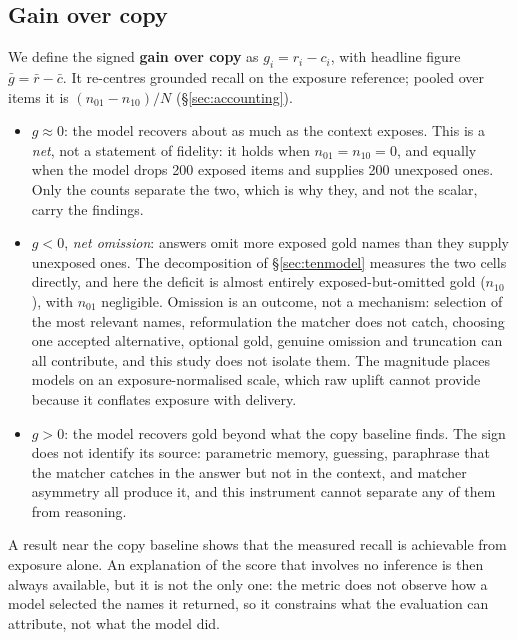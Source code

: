 \documentclass[10pt,twocolumn]{article}
\begin{document}
\subsection{Gain over copy}
We define the signed \textbf{gain over copy} as $g_i=r_i-c_i$, with headline figure $\bar g=\bar r-\bar c$. It re-centres grounded recall on the exposure reference; pooled over items it is $(n_{01}-n_{10})/N$ (\S\ref{sec:accounting}).
\begin{itemize}[topsep=2pt,itemsep=1pt,leftmargin=1.4em]
\item $g\approx0$: the model recovers about as much as the context exposes. This is a \emph{net}, not a statement of fidelity: it holds when $n_{01}=n_{10}=0$, and equally when the model drops 200 exposed items and supplies 200 unexposed ones. Only the counts separate the two, which is why they, and not the scalar, carry the findings.
\item $g<0$, \emph{net omission}: answers omit more exposed gold names than they supply unexposed ones. The decomposition of \S\ref{sec:tenmodel} measures the two cells directly, and here the deficit is almost entirely exposed-but-omitted gold ($n_{10}$), with $n_{01}$ negligible. Omission is an outcome, not a mechanism: selection of the most relevant names, reformulation the matcher does not catch, choosing one accepted alternative, optional gold, genuine omission and truncation can all contribute, and this study does not isolate them. The magnitude places models on an exposure-normalised scale, which raw uplift cannot provide because it conflates exposure with delivery.
\item $g>0$: the model recovers gold beyond what the copy baseline finds. The sign does not identify its source: parametric memory, guessing, paraphrase that the matcher catches in the answer but not in the context, and matcher asymmetry all produce it, and this instrument cannot separate any of them from reasoning.
\end{itemize}
A result near the copy baseline shows that the measured recall is achievable from exposure alone. An explanation of the score that involves no inference is then always available, but it is not the only one: the metric does not observe how a model selected the names it returned, so it constrains what the evaluation can attribute, not what the model did.
\end{document}
